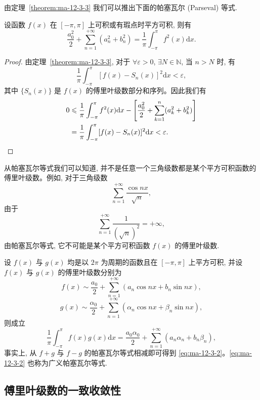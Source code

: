 由定理~\ref{theorem:ma-12-3-3} 我们可以推出下面的帕塞瓦尔 (Parseval) 等式.

\begin{theorem}[{帕塞瓦尔等式}]\label{theorem:ma-12-3-4}
设函数 $f(x)$ 在 $[-\pi,\pi]$ 上可积或有瑕点时平方可积, 则有
\[
  \frac{a_0^2}{2}+\sum_{n=1}^{+\infty}(a_n^2+b_n^2)
  =
  \frac1\pi\int_{-\pi}^{\pi}f^2(x)\mathrm dx.
\]
\end{theorem}


\begin{proof}
由定理~\ref{theorem:ma-12-3-3}, 对于 $\forall\varepsilon>0$, $\exists N\in\mathbb N$, 当 $n>N$ 时, 有
\[
  \frac1\pi\int_{-\pi}^{\pi}[f(x)-S_n(x)]^2\mathrm dx<\varepsilon,
\]
其中 $\{S_n(x)\}$ 是 $f(x)$ 的傅里叶级数部分和序列。因此我们有
\[
\begin{aligned}
  0
  &\leqslant\frac1\pi\int_{-\pi}^{\pi}f^2(x)\mathrm dx
  -\left[\frac{a_0^2}{2}+\sum_{k=1}^n(a_k^2+b_k^2)\right]\\
  &=\frac1\pi\int_{-\pi}^{\pi}[f(x)-S_n(x)]^2\mathrm dx
  <\varepsilon.
\end{aligned}
\qedhere
\]
\end{proof}


从帕塞瓦尔等式我们可以知道, 并不是任意一个三角级数都是某个平方可积函数的傅里叶级数。例如, 对于三角级数
\[
  \sum_{n=1}^{+\infty}\frac{\cos nx}{\sqrt n},
\]
由于
\[
  \sum_{n=1}^{+\infty}\frac1{(\sqrt n)^2}=+\infty,
\]
由帕塞瓦尔等式, 它不可能是某个平方可积函数 $f(x)$ 的傅里叶级数.

\begin{remark}\label{remark:ma-12-source-45}
设 $f(x)$ 与 $g(x)$ 均是以 $2\pi$ 为周期的函数且在 $[-\pi,\pi]$ 上平方可积, 并设 $f(x)$ 与 $g(x)$ 的傅里叶级数分别为
\[
  f(x)\sim\frac{a_0}{2}+\sum_{n=1}^{+\infty}(a_n\cos nx+b_n\sin nx),
\]
\[
  g(x)\sim\frac{\alpha_0}{2}+\sum_{n=1}^{+\infty}(\alpha_n\cos nx+\beta_n\sin nx),
\]
则成立
\begin{equation}
  \frac1\pi\int_{-\pi}^{\pi}f(x)g(x)\mathrm dx
  =
  \frac{a_0\alpha_0}{2}+\sum_{n=1}^{+\infty}(a_n\alpha_n+b_n\beta_n),
  \label{eq:ma-12-3-2}
\end{equation}
事实上, 从 $f+g$ 与 $f-g$ 的帕塞瓦尔等式相减即可得到 \eqref{eq:ma-12-3-2}。\eqref{eq:ma-12-3-2} 也称为广义帕塞瓦尔等式.
\end{remark}


\subsection{傅里叶级数的一致收敛性}
\label{subsec:ma-12-3-3}

